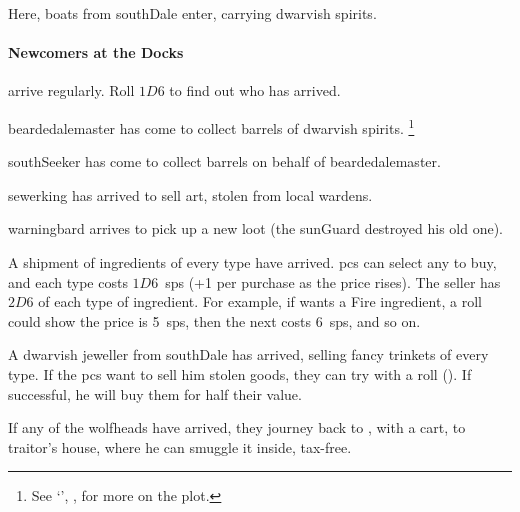 \begin{multicols}{2}

Here, boats from \gls{southDale} enter, carrying dwarvish spirits.

\paragraph{Newcomers at the Docks}
arrive regularly.
Roll $1D6$ to find out who has arrived.

\begin{dlist}
  \item
  \Gls{beardedalemaster} has come to collect barrels of dwarvish spirits.%
  \footnote{See `', , for more on the plot.}
  \item
  \Gls{southSeeker} has come to collect barrels on behalf of \gls{beardedalemaster}.
  \item
  \Gls{sewerking} has arrived to sell art, stolen from local \glspl{warden}.
  \item
  \Gls{warningbard} arrives to pick up a new loot (the \gls{sunGuard} destroyed his old one).
  \item
  A shipment of \glspl{ingredient} of every type have arrived.
  \Glspl{pc} can select any to buy, and each type costs $1D6$~\glspl{sp} (+1 per purchase as the price rises).
  The seller has $2D6$ of each type of \gls{ingredient}.
  For example, if  wants a Fire \gls{ingredient}, a roll could show the price is 5~\glspl{sp}, then the next costs 6~\glspl{sp}, and so on.
  \item
  A dwarvish jeweller from \gls{southDale} has arrived, selling fancy trinkets of every type.
  If the \glspl{pc} want to sell him stolen goods, they can try with a  roll (\tn[12]).
  If successful, he will buy them for half their value.
\end{dlist}

If any of the \glspl{wolfhead} have arrived, they journey back to , with a cart, to \gls{traitor}'s house, where he can smuggle it inside, tax-free.

\label{cronblight}


\end{multicols}
